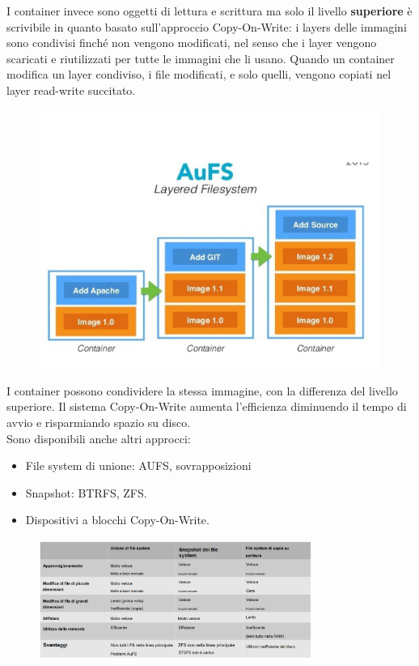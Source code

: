 \documentclass{article}
\begin{document}
		I container invece sono oggetti di lettura e scrittura ma solo il livello \textbf{superiore} è scrivibile in quanto basato sull'approccio Copy-On-Write: i layers delle immagini sono condivisi finché non vengono modificati, nel senso che i layer vengono scaricati e riutilizzati per tutte le immagini che li usano. Quando un container modifica un layer condiviso, i file modificati, e solo quelli, vengono copiati nel layer read-write succitato.
		\begin{figure}[ht]
			\centering
			\includegraphics[width=0.5\linewidth]{images/SAC_B5_layeredfs}

			\label{fig:sacb5layeredfs}
		\end{figure}
		
		I container possono condividere la stessa immagine, con la differenza del livello superiore. Il sistema Copy-On-Write aumenta l'efficienza diminuendo il tempo di avvio e risparmiando spazio su disco.\\
		Sono disponibili anche altri approcci:
		\begin{itemize}
		    \item File system di unione: AUFS, sovrapposizioni
		    \item Snapshot: BTRFS, ZFS.
		    \item Dispositivi a blocchi Copy-On-Write.
		\end{itemize}
		\begin{figure}[ht]
		    \centering
		    \includegraphics[width=0.8\textwidth]{SAC_B2_DockerFileSystem.png}
		\end{figure}
		
\end{document}
